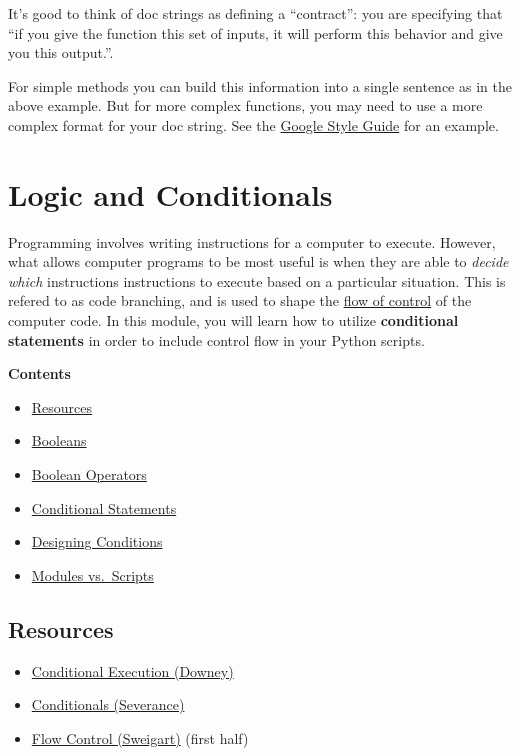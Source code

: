 \documentclass[]{book}
\providecommand{\tightlist}{%
  \setlength{\itemsep}{0pt}\setlength{\parskip}{0pt}}
\begin{document}
It's good to think of doc strings as defining a ``contract'': you are
specifying that ``if you give the function this set of inputs, it will
perform this behavior and give you this output.''.

For simple methods you can build this information into a single sentence
as in the above example. But for more complex functions, you may need to
use a more complex format for your doc string. See the
\href{http://google.github.io/styleguide/pyguide.html?showone=Comments\#Comments}{Google
Style Guide} for an example.

\chapter{Logic and Conditionals}\label{logic-and-conditionals}

Programming involves writing instructions for a computer to execute.
However, what allows computer programs to be most useful is when they
are able to \emph{decide which} instructions instructions to execute
based on a particular situation. This is refered to as code branching,
and is used to shape the
\href{https://en.wikipedia.org/wiki/Control_flow}{flow of control} of
the computer code. In this module, you will learn how to utilize
\textbf{conditional statements} in order to include control flow in your
Python scripts.

\textbf{Contents}

\begin{itemize}
\tightlist
\item
  \protect\hyperlink{resources}{Resources}
\item
  \protect\hyperlink{booleans}{Booleans}
\item
  \protect\hyperlink{boolean-operators}{Boolean Operators}
\item
  \protect\hyperlink{conditional-statements}{Conditional Statements}
\item
  \protect\hyperlink{designing-conditions}{Designing Conditions}
\item
  \protect\hyperlink{modules-vs-scripts}{Modules vs.~Scripts}
\end{itemize}

\section{Resources}\label{resources-1}

\begin{itemize}
\tightlist
\item
  \href{https://books.trinket.io/pfe/03-conditional.html}{Conditional
  Execution (Downey)}
\item
  \href{http://openbookproject.net/thinkcs/python/english3e/conditionals.html}{Conditionals
  (Severance)}
\item
  \href{https://automatetheboringstuff.com/chapter2/}{Flow Control
  (Sweigart)} (first half)
\end{itemize}
\end{document}
